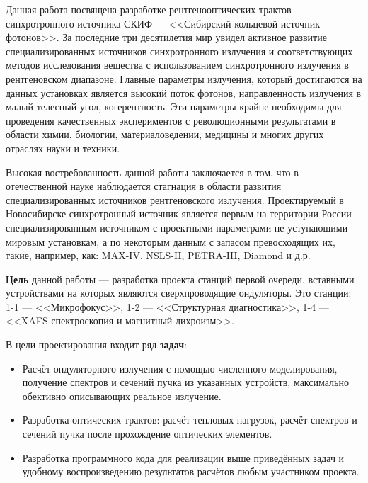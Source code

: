 {\actuality}
Данная работа посвящена разработке рентгенооптических трактов синхротронного источника СКИФ --- <<Сибирский кольцевой источник фотонов>>. За последние три десятилетия мир увидел активное развитие специализированных источников синхротронного излучения и соответствующих методов исследования вещества с использованием синхротронного излучения в рентгеновском диапазоне. Главные параметры излучения, который достигаются на данных установках является высокий поток фотонов, направленность излучения в малый телесный угол, когерентность. Эти параметры крайне необходимы для проведения качественных экспериментов с революционными результатами в области химии, биологии, материаловедении, медицины и многих других отраслях науки и техники.

Высокая востребованность данной работы заключается в том, что в отечественной науке наблюдается стагнация в области развития специализированных источников рентгеновского излучения. Проектируемый в Новосибирске синхротронный источник является первым на территории России специализированным источником с проектными параметрами не уступающими мировым установкам, а по некоторым данным с запасом превосходящих их, такие, например, как: MAX-IV, NSLS-II, PETRA-III, Diamond и д.р.

\textbf{Цель} данной работы --- разработка проекта станций первой очереди, вставными устройствами на которых являются сверхпроводящие ондуляторы. Это станции: 1-1 --- <<Микрофокус>>, 1-2 --- <<Структурная диагностика>>, 1-4 --- <<XAFS-спектроскопия и магнитный дихроизм>>.  

В цели проектирования входит ряд \textbf{задач}:
\begin{itemize}

	\item Расчёт ондуляторного излучения с помощью численного моделирования, получение спектров и сечений пучка из указанных устройств, максимально обективно описывающих реальное излучение.
	\item Разработка оптических трактов: расчёт тепловых нагрузок, расчёт спектров и сечений пучка после прохождение оптических элементов. 
	\item Разработка программного кода для реализации выше приведённых задач и удобному воспроизведению результатов расчётов любым участником проекта.

\end{itemize}
